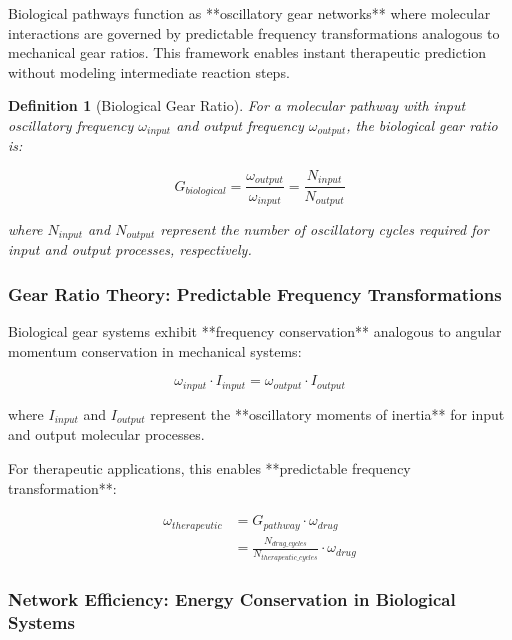 \documentclass[12pt,a4paper]{article}
\newtheorem{definition}{Definition}[section]
\begin{document}
Biological pathways function as **oscillatory gear networks** where molecular interactions are governed by predictable frequency transformations analogous to mechanical gear ratios. This framework enables instant therapeutic prediction without modeling intermediate reaction steps.

\begin{definition}[Biological Gear Ratio]
For a molecular pathway with input oscillatory frequency $\omega_{input}$ and output frequency $\omega_{output}$, the biological gear ratio is:

\begin{equation}
G_{biological} = \frac{\omega_{output}}{\omega_{input}} = \frac{N_{input}}{N_{output}}
\end{equation}

where $N_{input}$ and $N_{output}$ represent the number of oscillatory cycles required for input and output processes, respectively.
\end{definition}

\subsubsection{Gear Ratio Theory: Predictable Frequency Transformations}

Biological gear systems exhibit **frequency conservation** analogous to angular momentum conservation in mechanical systems:

\begin{equation}
\omega_{input} \cdot I_{input} = \omega_{output} \cdot I_{output}
\end{equation}

where $I_{input}$ and $I_{output}$ represent the **oscillatory moments of inertia** for input and output molecular processes.

For therapeutic applications, this enables **predictable frequency transformation**:

\begin{align}
\omega_{therapeutic} &= G_{pathway} \cdot \omega_{drug} \\
&= \frac{N_{drug\_cycles}}{N_{therapeutic\_cycles}} \cdot \omega_{drug}
\end{align}

\subsubsection{Network Efficiency: Energy Conservation in Biological Systems}
\end{document}
